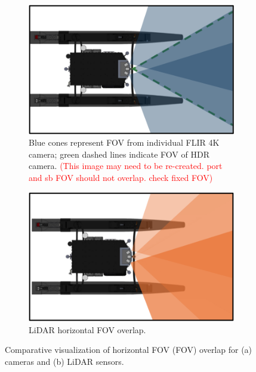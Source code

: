 \documentclass{erauthesis}
\begin{document}
\begin{figure}[htbp]
\centering
\begin{subfigure}[t]{0.48\textwidth}
    \centering
    \includegraphics[width=\textwidth]{Images/fov_cam.png}
    \caption{Blue cones represent \ac{FOV} from individual FLIR 4K camera; green dashed lines indicate \ac{FOV} of HDR camera. \textcolor{red}{(This image may need to be re-created. port and sb FOV should not overlap. check fixed FOV)}}
    \label{fig:fov_cam}
\end{subfigure}
\hfill
\begin{subfigure}[t]{0.48\textwidth}
    \centering
    \includegraphics[width=\textwidth]{Images/fov_lidar.png}
    \caption{LiDAR horizontal \ac{FOV} overlap.}
    \label{fig:fov_lidar}
\end{subfigure}
\caption{Comparative visualization of horizontal \ac{FOV} (FOV) overlap for (a) cameras and (b) LiDAR sensors.}
\label{fig:fov_combined}
\end{figure}
\end{document}
